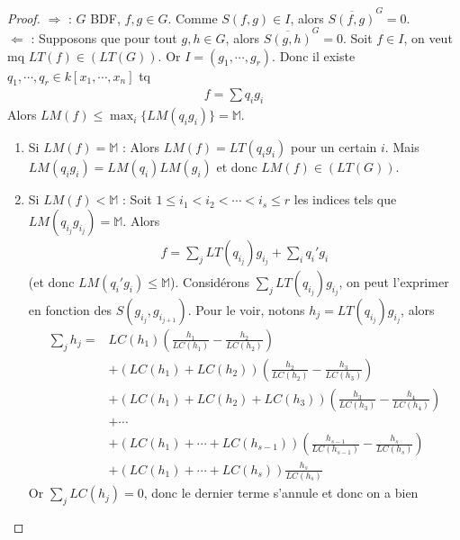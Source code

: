             \begin{proof}
                $\Rightarrow$ : $G$ BDF, $f,g \in G$. Comme $S(f,g) \in I$, alors $\overline{S(f,g)}^G = 0$. \\
                $\Leftarrow$ : Supposons que pour tout $g,h \in G$, alors $\overline{S(g,h)}^G = 0$. Soit $f \in I$, on veut mq $LT(f) \in (LT(G))$. Or $I = (g_1, \cdots, g_r)$. Donc il existe $q_1, \cdots, q_r \in k[x_1, \cdots, x_n]$ tq 
                \begin{align*}
                    f = \sum q_ig_i
                \end{align*}
                Alors $LM(f) \leq \max_i \{LM(q_ig_i)\} = \mathbb{M}$.
                \begin{enumerate}
                    \item Si $LM(f) = \mathbb{M}$ : Alors $LM(f) = LT(q_ig_i)$ pour un certain $i$. Mais $LM(q_ig_i) = LM(q_i)LM(g_i)$ et donc $LM(f) \in (LT(G))$.
                    \item Si $LM(f) < \mathbb{M}$ : Soit $1 \leq i_1 < i_2 < \cdots < i_s \leq r$ les indices tels que $LM(q_{i_j}g_{i_j}) = \mathbb{M}$. Alors 
                    \begin{align*}
                        f = \sum_j LT(q_{i_j})g_{i_j} + \sum_i q_i'g_i
                    \end{align*}
                    (et donc $LM(q_i'g_i) \leq \mathbb{M}$). Considérons $\sum_j LT(q_{i_j})g_{i_j}$, on peut l'exprimer en fonction des $S(g_{i_j}, g_{i_{j+1}})$. Pour le voir, notons $h_j = LT(q_{i_j})g_{i_j}$, alors
                    \begin{align*}
                        \sum_j h_j = &LC(h_1)\left( \frac{h_1}{LC(h_1)} - \frac{h_2}{LC(h_2)} \right) \\
                        &+ (LC(h_1) + LC(h_2))\left( \frac{h_2}{LC(h_2)} - \frac{h_3}{LC(h_3)} \right) \\
                        &+ (LC(h_1) + LC(h_2) + LC(h_3))\left( \frac{h_3}{LC(h_3)} - \frac{h_4}{LC(h_4)} \right) \\
                        & + \cdots \\
                        &+(LC(h_1) + \cdots + LC(h_{s-1}))\left( \frac{h_{s-1}}{LC(h_{s-1})} - \frac{h_s}{LC(h_s)} \right) \\
                        &+ (LC(h_1) + \cdots + LC(h_s))\frac{h_s}{LC(h_s)}
                    \end{align*}
                    Or $\sum_j LC(h_j) = 0$, donc le dernier terme s'annule et donc on a bien

\end{enumerate}
\end{proof}
